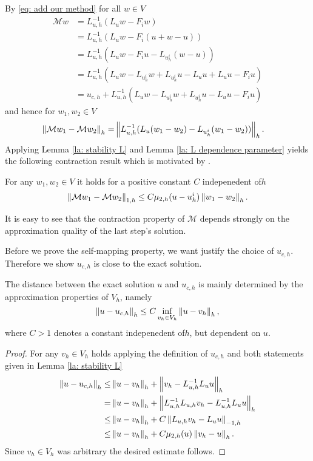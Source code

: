 By \eqref{eq: add our method} for all $w \in V$
\begin{align}
	\mathcal M w &= L_{u,h}^{-1}(L_u w - F_i w) \nonumber\\
				 &= L_{u,h}^{-1}(L_u w - F_i(u+w-u)) \nonumber\\
				 &= L_{u,h}^{-1}(L_u w - F_i u - L_{u^i_h} (w-u)) \nonumber\\
				 &=  L_{u,h}^{-1}(L_u w - L_{u^i_h} w + L_{u^i_h}u - L_u u + L_u u - F_i u) \nonumber\\
				 & = u_{c,h} + L_{u,h}^{-1}(L_u w - L_{u^i_h} w + L_{u^i_h}u - L_u u - F_i u) \label{eq: expand M}
 \end{align}
and hence for $w_1, w_2 \in V$
\begin{align*}
	\left\lVert \mathcal M w_1 - \mathcal M w_2 \right\rVert_{h} =& \left\lVert L_{u,h}^{-1}(L_u (w_1-w_2) - L_{u^i_h} (w_1-w_2)) \right\rVert_{h}.
\end{align*}
Applying Lemma \ref{la: stability L} and Lemma \ref{la: L dependence parameter} yields the following contraction result which is motivated by \cite[Lemma 3.4]{BGN+2011}.
\begin{lemma} \label{la: contraction property M}
	For any $w_1, w_2 \in V$ it holds for a positive constant $C$ indepenedent of$h$
\begin{align*}
	\left\lVert \mathcal M w_1 - \mathcal M w_2 \right\rVert_{1,h}	\leq C \mu_{2,h}(u - u^i_h) \left\lVert w_1 - w_2 \right\rVert_{h}. \label{eq: estimate M}
\end{align*}
\end{lemma}
It is easy to see that the contraction property of $\mathcal{M}$ depends strongly on the approximation quality of the last step's solution. %

Before we prove the self-mapping property, we want justify the choice of $u_{c,h}$. Therefore we show $u_{c,h}$ is close to the exact \MA solution.

\begin{lemma}\label{la: difference u uch}
	The distance between the exact solution $u$ and $u_{c,h}$ is mainly determined by the approximation properties of $V_h$, namely
	\[
		\left\lVert u-u_{c,h} \right\rVert_{h} \leq C \inf_{v_h \in V_h} \left\lVert u-v_h \right\rVert_{h},
	\]
	where $C>1$ denotes a constant indepenedent of$h$, but dependent on $u$.
\end{lemma}
\begin{proof}
	For any $v_h \in V_h$ holds applying the definition of $u_{c,h}$ and both statements given in Lemma \ref{la: stability L}
	\begin{align}
		\left\lVert u-u_{c,h} \right\rVert_{h} \leq& \left\lVert u- v_h \right\rVert_{h} + \left\lVert  v_h- L_{u,h}^{-1}L_u u \right\rVert_{h} \nonumber \\
			=& \left\lVert u- v_h \right\rVert_{h} + \left\lVert L_{u,h}^{-1}L_{u,h} v_h- L_{u,h}^{-1}L_u u \right\rVert_{h} \nonumber \\
			\leq& \left\lVert u- v_h \right\rVert_{h} + C \left\lVert L_{u,h} v_h-  L_u u \right\rVert_{-1,h} \nonumber \\
			\leq& \left\lVert u- v_h \right\rVert_{h} + C \mu_{2,h}(u)\left\lVert v_h -u \right\rVert_{h}. \nonumber
	\end{align}
	Since $v_h \in V_h$ was arbitrary the desired estimate follows.
\end{proof}

